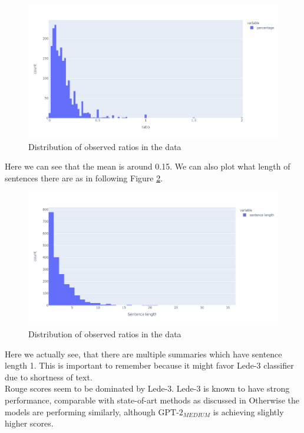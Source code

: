 \documentclass{article}
\newcommand{\gptmedium}{$\text{GPT-2}_{MEDIUM}$ }
\begin{document}
\noindent
\begin{figure}[h!]
	\centering
	\hspace*{-3cm}
	\includegraphics[scale=0.55]{empirical_ratio.png}
	\caption{Distribution of observed ratios in the data}
	\label{fig:empirical_ratio}
\end{figure}

\noindent
Here we can see that the mean is around 0.15. We can also plot what length of sentences there are as in following Figure \ref{fig:empirical_lengths}.

\noindent
\begin{figure}[h]
	\centering
	\hspace*{-3cm}
	\includegraphics[scale=0.55]{empirical_lengths.png}
	\caption{Distribution of observed ratios in the data}
	\label{fig:empirical_lengths}
\end{figure}

\noindent
Here we actually see, that there are multiple summaries which have sentence length 1. This is important to remember because it might favor Lede-3 classifier due to shortness of text.\\

\noindent
Rouge scores seem to be dominated by Lede-3. Lede-3 is known to have strong performance, comparable with state-of-art methods as discussed in \cite{dataset} Otherwise the models are performing similarly, although \gptmedium is achieving slightly higher scores. 
\end{document}
